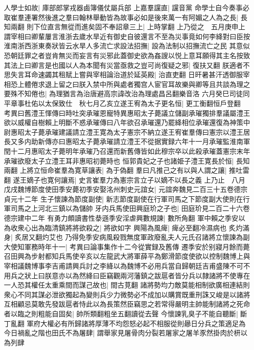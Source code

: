 人學士如故|{
	庫部郎掌戎器鹵簿儀仗屬兵部}
上嘉羣讜直|{
	讜音黨}
命學士自今奏事必取崔羣連署然後進之羣曰翰林舉動皆為故事必如是後來萬一有阿媚之人為之長|{
	長知兩翻}
則下位直言無從而進矣固不奉詔章三上|{
	上時掌翻}
上乃從之　五月庚申上謂宰相曰卿輩屢言淮浙去歲水旱近有御史自彼還言不至為災事竟如何李絳對曰臣按淮南浙西浙東奏狀皆云水旱人多流亡求設法招撫|{
	設為法制以招撫流亡之民}
其意似恐朝廷罪之者豈肯無災而妄言有災邪此蓋御史欲為姦謏以悦上意耳願得其主名按致其法上曰卿言是也國以人為本聞有災當亟救之豈可尚復疑之邪|{
	復扶又翻}
朕適者不思失言耳命速蠲其租賦上嘗與宰相論治道於延英殿|{
	治直吏翻}
日旰暑甚汗透御服宰相恐上體倦求退上留之曰朕入禁中所與處者獨宫人宦官耳故樂與卿等且共談為理之要殊不知倦也|{
	為理猶言為治唐避高宗諱改治為理處昌呂翻樂音洛}
六月癸巳司徒同平章事杜佑以太保致仕　秋七月乙亥立遂王宥為太子更名恒|{
	更工衡翻恒戶登翻　考異曰舊澧王惲傳曰時吐突承璀恩寵特異惠昭太子薨議立儲副承璀獨排羣議屬澧王欲以威權自樹賴上明斷不惑承璀傳曰八年欲召承璀還乃罷絳相位承璀還復為神策中尉惠昭太子薨承璀建議請立澧王寛為太子憲宗不納立遂王宥崔羣傳曰憲宗以澧王居長又多内助新傳亦曰惠昭太子薨承璀請立澧王不從据實録六年十一月承璀監淮南軍閏十二月惠昭太子薨明年承璀乃召還而新舊傳皆如此穆宗卒以此殺承璀蓋憲宗末年承璀欲廢太子立澧王耳非惠昭初薨時也}
恒郭貴妃之子也諸姫子澧王寛長於恒|{
	長知兩翻}
上將立恒命崔羣為寛草讓表|{
	為于偽翻}
羣曰凡推己之有以與人謂之讓|{
	推吐雷翻}
遂王嫡子也寛何讓焉|{
	史言崔羣力為憲宗言立子以嫡不以長之義}
上乃止　八月戊戌魏博節度使田季安薨初季安娶洺州刺史元誼女|{
	元誼奔魏見二百三十五卷德宗貞元十二年}
生子懷諫為節度副使|{
	新志節度副使在行軍司馬之下節度副大使則在行軍司馬之上河北三鎮以為儲帥}
牙内兵馬使田興庭玠之子也|{
	田庭玠見二百二十六卷德宗建中二年}
有勇力頗讀書性㳟遜季安淫虐興數規諫|{
	數所角翻}
軍中賴之季安以為收衆心出為臨清鎮將將欲殺之|{
	將欲如字}
興陽為風痺|{
	痺必至翻冷濕病也}
炙灼滿身|{
	炙居又翻灼艾也}
乃得免季安病風殺戮無度軍政廢亂夫人元氏召諸將立懷諫為副大使知軍務時年十一|{
	考異曰論事集作十二今從實録及舊傳}
遷季安於别寢月餘而薨召田興為步射都知兵馬使辛亥以左龍武大將軍薛平為鄭滑節度使欲以控制魏博上與宰相議魏博事李吉甫請興兵討之李絳以為魏博不必用兵當自歸朝廷吉甫盛陳不可不用兵之狀上曰朕意亦以為然絳曰臣竊觀兩河藩鎮之跋扈者皆分兵以隸諸將不使專在一人恐其權任太重乘間而謀己故也|{
	間古莧翻}
諸將勢均力敵莫能相制欲廣相連結則衆心不同其謀必泄欲獨起為變則兵少力微勢必不成加以購賞既重刑誅又峻是以諸將互相顧忌莫敢先發跋扈者恃此以為長策然臣竊思之若常得嚴明主帥能制諸將之死命者以臨之則粗能自固矣|{
	帥所類翻粗坐五翻讀從去聲}
今懷諫乳臭子不能自聽斷|{
	斷丁亂翻}
軍府大權必有所歸諸將厚薄不均怨怒必起不相服從則曏日分兵之策適足為今日禍亂之階也田氏不為屠肆|{
	謂舉家見屠骨肉分裂若屠家之屠羊豕然掛肉於枅以為列肆}
